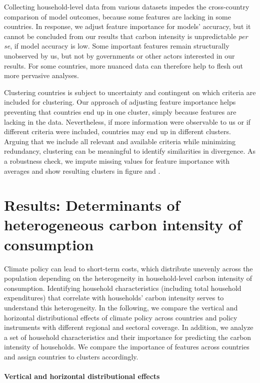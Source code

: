 \documentclass[12pt, a4paper]{article}
\begin{document}
Collecting household-level data from various datasets impedes the cross-country comparison of model outcomes, because some features are lacking in some countries. In response, we adjust feature importance for models' accuracy, but it cannot be concluded from our results that carbon intensity is unpredictable \textit{per se}, if model accuracy is low. Some important features remain structurally unobserved by us, but not by governments or other actors interested in our results. For some countries, more nuanced data can therefore help to flesh out more pervasive analyses.

Clustering countries is subject to uncertainty and contingent on which criteria are included for clustering. Our approach of adjusting feature importance helps preventing that countries end up in one cluster, simply because features are lacking in the data. Nevertheless, if more information were observable to us or if different criteria were included, countries may end up in different clusters. Arguing that we include all relevant and available criteria while minimizing redundancy, clustering can be meaningful to identify similarities in divergence. As a robustness check, we impute missing values for feature importance with averages and show resulting clusters in figure  and .

\section{Results: Determinants of heterogeneous carbon intensity of consumption} \label{sec:results}

Climate policy can lead to short-term costs, which distribute unevenly across the population depending on the heterogeneity in household-level carbon intensity of consumption. Identifying household characteristics (including total household expenditures) that correlate with households' carbon intensity serves to understand this heterogeneity. In the following, we compare the vertical and horizontal distributional effects of climate policy across countries and policy instruments with different regional and sectoral coverage. In addition, we analyze a set of household characteristics and their importance for predicting the carbon intensity of households. We compare the importance of features across countries and assign countries to clusters accordingly.

\paragraph{Vertical and horizontal distributional effects}
\end{document}

